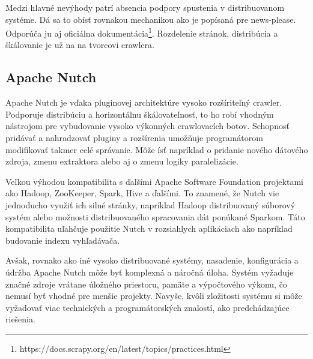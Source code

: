 Medzi hlavné nevýhody patrí absencia podpory spustenia v distribuovanom systéme. Dá sa to obísť rovnakou mechanikou ako je popísaná pre news-please. Odporúča ju aj oficiálna dokumentácia\footnote{https://docs.scrapy.org/en/latest/topics/practices.html}. Rozdelenie stránok, distribúcia a škálovanie je už na na tvorcovi crawlera. 

\subsection{Apache Nutch}
Apache Nutch je vďaka pluginovej architektúre vysoko rozšíriteľný crawler. Podporuje distribúciu a horizontálnu škálovateľnosť, to ho robí vhodným nástrojom pre vybudovanie vysoko výkonných crawlovacích botov. Schopnosť pridávať a nahradzovať pluginy a rozšírenia umožňuje programátorom modifikovať takmer celé správanie. Môže ísť napríklad o pridanie nového dátového zdroja, zmenu extraktora alebo aj o zmenu logiky paralelizácie. 

Veľkou výhodou kompatibilita s ďalšími Apache Software Foundation projektami ako Hadoop, ZooKeeper, Spark, Hive a ďalšími. To znamené, že Nutch vie jednoducho využiť ich silné stránky, napríklad Hadoop distribuovaný súborový systém alebo možnosti distribuovaného spracovania dát ponúkané Sparkom. Táto kompatibilita uľahčuje použitie Nutch v rozsiahlych aplikáciach ako napríklad budovanie indexu vyhľadávača. 

Avšak, rovnako ako iné vysoko distribuované systémy, nasadenie, konfigurácia a údržba Apache Nutch môže byť komplexná a náročná úloha. Systém vyžaduje značné zdroje vrátane úložného priestoru, pamäte a výpočtového výkonu, čo nemusí byť vhodné pre menšie projekty. Navyše, kvôli zložitosti systému si môže vyžadovať viac technických a programátorských znalostí, ako predchádzajúce riešenia.
